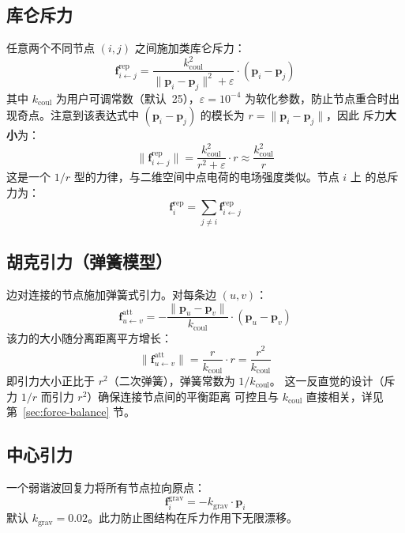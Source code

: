 \documentclass[11pt,a4paper]{report}
\begin{document}
\subsection{库仑斥力}
\label{sec:repulsion}
任意两个不同节点 $(i, j)$ 之间施加类库仑斥力：
\begin{equation}
    \mathbf{f}^{\text{rep}}_{i \leftarrow j} =
    \frac{k_{\text{coul}}^2}{\|\mathbf{p}_i - \mathbf{p}_j\|^2 + \varepsilon}
    \cdot (\mathbf{p}_i - \mathbf{p}_j)
    \label{eq:coulomb}
\end{equation}
其中 $k_{\text{coul}}$ 为用户可调常数（默认~25），$\varepsilon = 10^{-4}$
为软化参数，防止节点重合时出现奇点。注意到该表达式中 $(\mathbf{p}_i -
\mathbf{p}_j)$ 的模长为 $r = \|\mathbf{p}_i - \mathbf{p}_j\|$，因此
斥力\textbf{大小}为：
\begin{equation}
    \|\mathbf{f}^{\text{rep}}_{i \leftarrow j}\|
    = \frac{k_{\text{coul}}^2}{r^2 + \varepsilon} \cdot r
    \approx \frac{k_{\text{coul}}^2}{r}
    \label{eq:coulomb-mag}
\end{equation}
这是一个 $1/r$ 型的力律，与二维空间中点电荷的电场强度类似。节点 $i$ 上
的总斥力为：
\begin{equation}
    \mathbf{f}^{\text{rep}}_i = \sum_{j \neq i} \mathbf{f}^{\text{rep}}_{i \leftarrow j}
    \label{eq:rep-total}
\end{equation}
\subsection{胡克引力（弹簧模型）}
\label{sec:attraction}
边对连接的节点施加弹簧式引力。对每条边 $(u, v)$：
\begin{equation}
    \mathbf{f}^{\text{att}}_{u \leftarrow v} =
    -\frac{\|\mathbf{p}_u - \mathbf{p}_v\|}{k_{\text{coul}}}
    \cdot (\mathbf{p}_u - \mathbf{p}_v)
    \label{eq:hooke}
\end{equation}
该力的大小随分离距离平方增长：
\begin{equation}
    \|\mathbf{f}^{\text{att}}_{u \leftarrow v}\|
    = \frac{r}{k_{\text{coul}}} \cdot r
    = \frac{r^2}{k_{\text{coul}}}
    \label{eq:hooke-mag}
\end{equation}
即引力大小正比于 $r^2$（二次弹簧），弹簧常数为 $1/k_{\text{coul}}$。
这一反直觉的设计（斥力 $1/r$ 而引力 $r^2$）确保连接节点间的平衡距离
可控且与 $k_{\text{coul}}$ 直接相关，详见第~\ref{sec:force-balance} 节。
\subsection{中心引力}
\label{sec:gravity}
一个弱谐波回复力将所有节点拉向原点：
\begin{equation}
    \mathbf{f}^{\text{grav}}_i = -k_{\text{grav}} \cdot \mathbf{p}_i
    \label{eq:gravity}
\end{equation}
默认 $k_{\text{grav}} = 0.02$。此力防止图结构在斥力作用下无限漂移。
\end{document}
